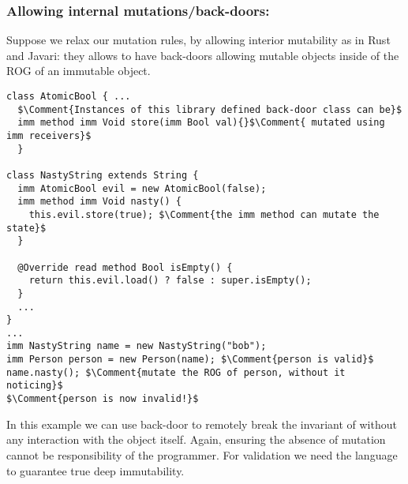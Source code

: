 \subsubsection*{Allowing internal mutations/back-doors:}
Suppose we relax our mutation rules, by allowing interior mutability
as in Rust and Javari: they allows to have back-doors allowing mutable objects inside of 
the ROG of an immutable object.
\begin{lstlisting}
class AtomicBool { ...
  $\Comment{Instances of this library defined back-door class can be}$
  imm method imm Void store(imm Bool val){}$\Comment{ mutated using imm receivers}$
  }

class NastyString extends String {
  imm AtomicBool evil = new AtomicBool(false);
  imm method imm Void nasty() {
    this.evil.store(true); $\Comment{the imm method can mutate the state}$
  }

  @Override read method Bool isEmpty() {
    return this.evil.load() ? false : super.isEmpty();
  }
  ...
}
...
imm NastyString name = new NastyString("bob");
imm Person person = new Person(name); $\Comment{person is valid}$
name.nasty(); $\Comment{mutate the ROG of person, without it noticing}$
$\Comment{person is now invalid!}$
\end{lstlisting}

In this example we can use \Q@NastyString@ back-door to remotely break the invariant of \Q@person@ without
any interaction with the \Q@person@ object itself.
Again, ensuring the absence of \Q@String@ mutation cannot be responsibility of the \Q@Person@ programmer.
For validation we need the language to guarantee true deep immutability.


